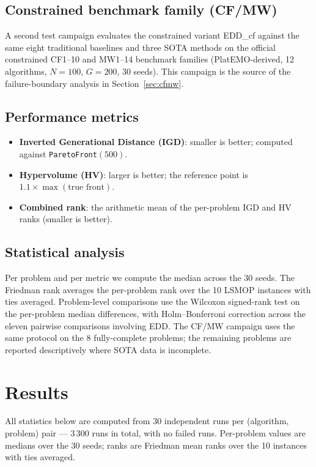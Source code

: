 \documentclass[preprint,12pt]{elsarticle}
\begin{document}
\subsection{Constrained benchmark family (CF/MW)}

A second test campaign evaluates the constrained variant EDD\_cf against the
same eight traditional baselines and three SOTA methods on the official
constrained CF1--10 and MW1--14 benchmark families (PlatEMO-derived, 12
algorithms, $N=100$, $G=200$, 30 seeds). This campaign is the source of the
failure-boundary analysis in Section~\ref{sec:cfmw}.

\subsection{Performance metrics}

\begin{itemize}
\item \textbf{Inverted Generational Distance (IGD)}: smaller is better;
computed against \texttt{ParetoFront}$(500)$.
\item \textbf{Hypervolume (HV)}: larger is better; the reference point is
$1.1 \times \max(\text{true front})$.
\item \textbf{Combined rank}: the arithmetic mean of the per-problem IGD
and HV ranks (smaller is better).
\end{itemize}

\subsection{Statistical analysis}

Per problem and per metric we compute the median across the 30 seeds. The
Friedman rank averages the per-problem rank over the 10 LSMOP instances with
ties averaged. Problem-level comparisons use the Wilcoxon signed-rank test on
the per-problem median differences, with Holm--Bonferroni correction across
the eleven pairwise comparisons involving EDD. The CF/MW campaign uses the
same protocol on the 8 fully-complete problems; the remaining problems are
reported descriptively where SOTA data is incomplete.

\section{Results}
\label{sec:results}

All statistics below are computed from 30 independent runs per
(algorithm, problem) pair --- $3\,300$ runs in total, with no failed runs.
Per-problem values are medians over the 30 seeds; ranks are Friedman mean
ranks over the 10 instances with ties averaged.
\end{document}
